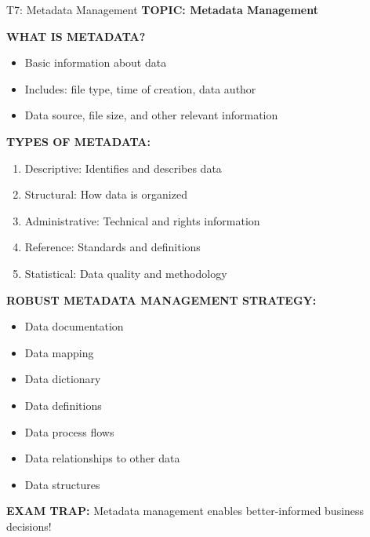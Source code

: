 \documentclass[8pt]{beamer}
\begin{document}
	\begin{frame}{T7: Metadata Management}
		\fontsize{6.5}{7.5}\selectfont
		\textbf{TOPIC: Metadata Management}
		
		\vspace{0.1cm}
		\textbf{WHAT IS METADATA?}
		\begin{itemize}
			\item Basic information about data
			\item Includes: file type, time of creation, data author
			\item Data source, file size, and other relevant information
		\end{itemize}
		
		\vspace{0.1cm}
		\textbf{TYPES OF METADATA:}
		\begin{enumerate}
			\item \textcolor{myblue}{Descriptive:} Identifies and describes data
			\item \textcolor{myblue}{Structural:} How data is organized
			\item \textcolor{myblue}{Administrative:} Technical and rights information
			\item \textcolor{myblue}{Reference:} Standards and definitions
			\item \textcolor{myblue}{Statistical:} Data quality and methodology
		\end{enumerate}
		
		\vspace{0.1cm}
		\textbf{ROBUST METADATA MANAGEMENT STRATEGY:}
		\begin{itemize}
			\item Data documentation
			\item Data mapping
			\item Data dictionary
			\item Data definitions
			\item Data process flows
			\item Data relationships to other data
			\item Data structures
		\end{itemize}
		
		\textcolor{myred}{\textbf{EXAM TRAP:}} Metadata management enables \textcolor{myblue}{better-informed business decisions}!
	\end{frame}
	
\end{document}
